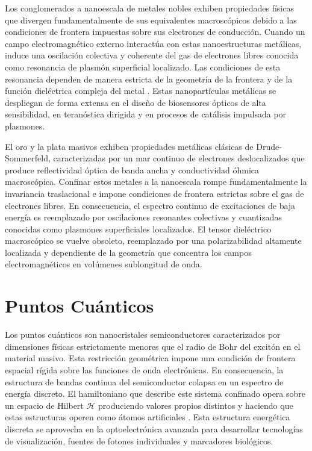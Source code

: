 \documentclass[pdflatex,sn-mathphys-num]{sn-jnl}
\theoremstyle{thmstyleone}%
\theoremstyle{thmstyletwo}%
\theoremstyle{thmstylethree}%
\begin{document}
Los conglomerados a nanoescala de metales nobles exhiben propiedades físicas
que divergen fundamentalmente de sus equivalentes macroscópicos debido a las
condiciones de frontera impuestas sobre sus electrones de conducción. Cuando
un campo electromagnético externo interactúa con estas nanoestructuras
metálicas, induce una oscilación colectiva y coherente del gas de electrones
libres conocida como resonancia de plasmón superficial localizado. Las
condiciones de esta resonancia dependen de manera estricta de la geometría
de la frontera y de la función dieléctrica compleja del metal
\cite{kelaniComparingSilverGold2024}.
Estas nanopartículas metálicas se despliegan de
forma extensa en el diseño de biosensores ópticos de alta sensibilidad, en
teranóstica dirigida y en procesos de catálisis impulsada por plasmones.

El oro y la plata masivos exhiben propiedades metálicas clásicas de
Drude-Sommerfeld, caracterizadas por un mar continuo de electrones
deslocalizados que produce reflectividad óptica de banda ancha y conductividad
óhmica macroscópica. Confinar estos metales a la nanoescala rompe
fundamentalmente la invariancia traslacional e impone condiciones de frontera
estrictas sobre el gas de electrones libres. En consecuencia, el espectro
continuo de excitaciones de baja energía es reemplazado por oscilaciones
resonantes colectivas y cuantizadas conocidas como plasmones superficiales
localizados. El tensor dieléctrico macroscópico se vuelve obsoleto, reemplazado
por una polarizabilidad altamente localizada y dependiente de la geometría que
concentra los campos electromagnéticos en volúmenes sublongitud de onda.

\section{Puntos Cuánticos}
\label{sec:puntos_cuanticos}

Los puntos cuánticos son nanocristales semiconductores caracterizados por
dimensiones físicas estrictamente menores que el radio de Bohr del excitón en
el material masivo. Esta restricción geométrica impone una condición de
frontera espacial rígida sobre las funciones de onda electrónicas. En
consecuencia, la estructura de bandas continua del semiconductor colapsa en
un espectro de energía discreto. El hamiltoniano que describe este sistema
confinado opera sobre un espacio de Hilbert $\mathcal{H}$ produciendo valores
propios distintos y haciendo que estas estructuras operen como átomos
artificiales \cite{fengSemiconductorQuantumDots2024}.
Esta estructura energética discreta se
aprovecha en la optoelectrónica avanzada para desarrollar tecnologías de
visualización, fuentes de fotones individuales y marcadores biológicos.
\end{document}
